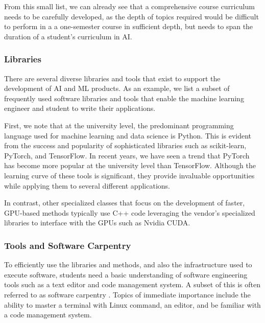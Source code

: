 \documentclass[utf8]{FrontiersinVancouver} %
\begin{document}
From this small list, we can already see that a comprehensive course
curriculum needs to be carefully developed, as the depth of topics
required would be difficult to perform in a a one-semester course in
sufficient depth, but needs to span the duration of a student's
curriculum in AI.

\subsubsection{Libraries}

There are several diverse libraries and tools that exist to support
the development of AI and ML products.  As an example, we list a
subset of frequently used software libraries and tools that enable the
machine learning engineer and student to write their applications.

First, we note that at the university level, the predominant
programming language used for machine learning and data science is
Python. This is evident from the success and popularity of
sophisticated libraries such as scikit-learn, PyTorch, and
TensorFlow. In recent years, we have seen a trend that PyTorch has
become more popular at the university level than TensorFlow.  Although
the learning curve of these tools is significant, they provide
invaluable opportunities while applying them to several different
applications.

In contrast, other specialized classes that focus on the development
of faster, GPU-based methods typically use C++ code leveraging the
vendor's specialized libraries to interface with the GPUs such as
Nvidia CUDA.

\subsubsection{Tools and Software Carpentry}\label{sec:tools}


To efficiently use the libraries and methods, and also the
infrastructure used to execute software, students need a basic
understanding of software engineering tools such as a text editor and
code management system.  A subset of this is often referred to as
software carpentry \cite{software-carpentry}. Topics of immediate
importance include the ability to master a terminal with Linux
command, an editor, and be familiar with a code management system.
\end{document}
